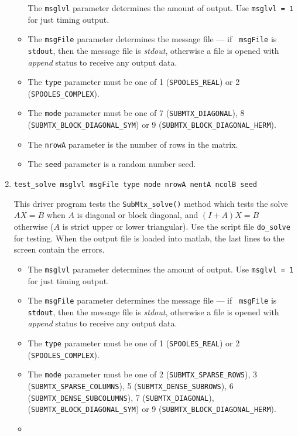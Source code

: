 \begin{enumerate}
\begin{itemize}
The {\tt msglvl} parameter determines the amount of output.
Use {\tt msglvl = 1} for just timing output.
\item
The {\tt msgFile} parameter determines the message file --- if {\tt
msgFile} is {\tt stdout}, then the message file is {\it stdout},
otherwise a file is opened with {\it append} status to receive any
output data.
\item
The {\tt type} parameter must be one of 1 ({\tt SPOOLES\_REAL})
or 2 ({\tt SPOOLES\_COMPLEX}). 
\item
The {\tt mode} parameter must be one of
7 ({\tt SUBMTX\_DIAGONAL}),
8 ({\tt SUBMTX\_BLOCK\_DIAGONAL\_SYM}) or
9 ({\tt SUBMTX\_BLOCK\_DIAGONAL\_HERM}).
\item
The {\tt nrowA} parameter is the number of rows in the matrix. 
\item
The {\tt seed} parameter is a random number seed.
\end{itemize}
\item
\begin{verbatim}
test_solve msglvl msgFile type mode nrowA nentA ncolB seed
\end{verbatim}
This driver program tests 
the {\tt SubMtx\_solve()} method
which tests the solve
$AX = B$ when $A$ is diagonal or block diagonal,
and $(I + A)X = B$ otherwise ($A$ is strict upper or lower
triangular).
Use the script file {\tt do\_solve} for testing.
When the output file is loaded into matlab,
the last lines to the screen contain the errors.
\par
\begin{itemize}
\item
The {\tt msglvl} parameter determines the amount of output.
Use {\tt msglvl = 1} for just timing output.
\item
The {\tt msgFile} parameter determines the message file --- if {\tt
msgFile} is {\tt stdout}, then the message file is {\it stdout},
otherwise a file is opened with {\it append} status to receive any
output data.
\item
The {\tt type} parameter must be one of 1 ({\tt SPOOLES\_REAL})
or 2 ({\tt SPOOLES\_COMPLEX}). 
\item
The {\tt mode} parameter must be one of
2 ({\tt SUBMTX\_SPARSE\_ROWS}),
3 ({\tt SUBMTX\_SPARSE\_COLUMNS}),
5 ({\tt SUBMTX\_DENSE\_SUBROWS}),
6 ({\tt SUBMTX\_DENSE\_SUBCOLUMNS}),
7 ({\tt SUBMTX\_DIAGONAL}),  ({\tt SUBMTX\_BLOCK\_DIAGONAL\_SYM}) or
9 ({\tt SUBMTX\_BLOCK\_DIAGONAL\_HERM}).
\item

\end{itemize}
\end{enumerate}
